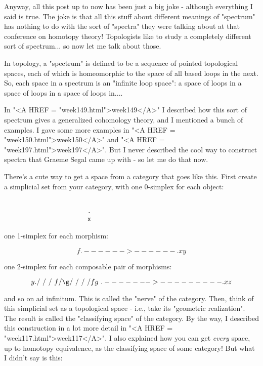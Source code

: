 Anyway, all this post up to now has been just a big joke - although everything
I said is true.  The joke is that all this stuff about different meanings of 
"spectrum" has nothing to do with the sort of "spectra" they were
talking about at that conference on homotopy theory!  Topologists like to
study a completely different sort of spectrum... so now let me talk about
those.
 
In topology, a "spectrum" is defined to be a sequence of pointed
topological spaces, each of which is homeomorphic to the space of all
based loops in the next.  So, each space in a spectrum is an "infinite
loop space": a space of loops in a space of loops in a space of loops
in....

In "<A HREF = "week149.html">week149</A>" I described how this sort of spectrum gives a generalized
cohomology theory, and I mentioned a bunch of examples. I gave some
more examples in "<A HREF = "week150.html">week150</A>" and "<A HREF = "week197.html">week197</A>".  But I never described the
cool way to construct spectra that Graeme Segal came up with - so let
me do that now.

There's a cute way to get a space from a category that goes like this.
First create a simplicial set from your category, with one 0-simplex for
each object:


\begin{verbatim}

                       .
                       x
\end{verbatim}
    
one 1-simplex for each morphism:


$$

                       f
                .------>------.
                x             y
$$
    
one 2-simplex for each composable pair of morphisms:


$$

                       y
                       .
                      / \
                     /   \
                    /     \
                  f/       \g
                  /         \
                 /           \
                /             \
               /      fg       \
              .------->---------.
              x                 z

$$
    
and so on ad infinitum.  This is called the "nerve" of the category.
Then, think of this simplicial set as a topological space - i.e., take
its "geometric realization".  The result is called the "classifying
space" of the category.  By the way, I described this construction in
a lot more detail in "<A HREF = "week117.html">week117</A>".  I also explained how you can get
\emph{every} space, up to homotopy equivalence, as the classifying space of
some category!  But what I didn't say is this:

